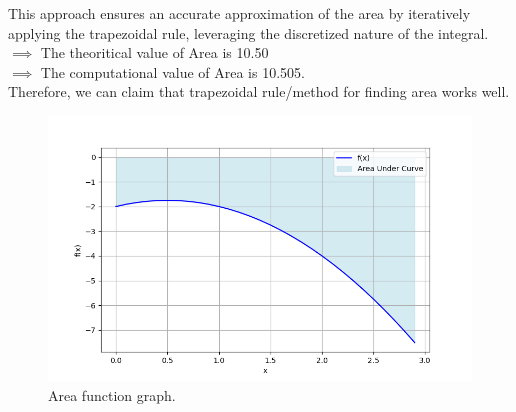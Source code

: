 \documentclass[article]{IEEEtran}
\numberwithin{figure}{enumi}
\begin{document}
This approach ensures an accurate approximation of the area by iteratively applying the trapezoidal rule, leveraging the discretized nature of the integral.\\
$ \implies$ The theoritical value of Area is 10.50\\
 $ \implies$ The computational value of Area is 10.505.\\
 Therefore, we can claim that trapezoidal rule/method for finding area works well.
 \begin{figure}[h!]
	\centering
	\includegraphics[width=\columnwidth]{figures/Figure_1.png}
	\caption{Area function graph.}
	\label{stemplot}
\end{figure}
\end{document}
